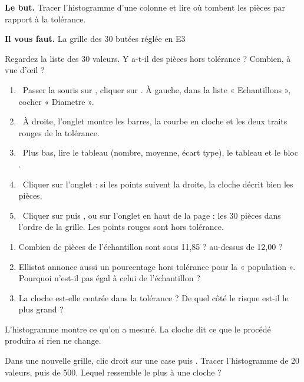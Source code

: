 \documentclass[10pt,a4paper]{article}
\begin{document}
\thispagestyle{fancy}
\begin{tcolorbox}[boite]\textbf{Le but.} Tracer l'histogramme d'une colonne et lire où tombent les pièces par rapport à la tolérance.\par\textbf{Il vous faut.} La grille des 30 butées réglée en E3\end{tcolorbox}
\begin{tcolorbox}[pred]Regardez la liste des 30 valeurs. Y a-t-il des pièces hors tolérance ? Combien, à vue d'œil ?\reponse\end{tcolorbox}
\begin{enumerate}[label=\textcolor{cyan}{\textbf{\arabic*.}},leftmargin=15pt,itemsep=1.5pt]
\item \tagE\ Passer la souris sur , cliquer sur . À gauche, dans la liste « Echantillons », cocher « Diametre ».
\item \tagE\ À droite, l'onglet  montre les barres, la courbe en cloche et les deux traits rouges de la tolérance.
\item \tagE\ Plus bas, lire le tableau  (nombre, moyenne, écart type), le tableau  et le bloc .
\item \tagE\ Cliquer sur l'onglet  : si les points suivent la droite, la cloche décrit bien les pièces.
\item \tagE\ Cliquer sur  puis , ou sur l'onglet  en haut de la page : les 30 pièces dans l'ordre de la grille. Les points rouges sont hors tolérance.
\end{enumerate}
\begin{enumerate}[label=\textcolor{cyan}{\textbf{Q\arabic*.}},leftmargin=22pt]
\item Combien de pièces de l'échantillon sont sous 11,85 ? au-dessus de 12,00 ?\reponse[1]
\item Ellistat annonce aussi un pourcentage hors tolérance pour la « population ». Pourquoi n'est-il pas égal à celui de l'échantillon ?\reponse[2]
\item La cloche est-elle centrée dans la tolérance ? De quel côté le risque est-il le plus grand ?\reponse[1]
\end{enumerate}
\begin{tcolorbox}[retenir]L'histogramme montre ce qu'on a mesuré. La cloche dit ce que le procédé produira si rien ne change.\end{tcolorbox}
\begin{tcolorbox}[plus]Dans une nouvelle grille, clic droit sur une case puis . Tracer l'histogramme de 20 valeurs, puis de 500. Lequel ressemble le plus à une cloche ?\end{tcolorbox}
\end{document}
